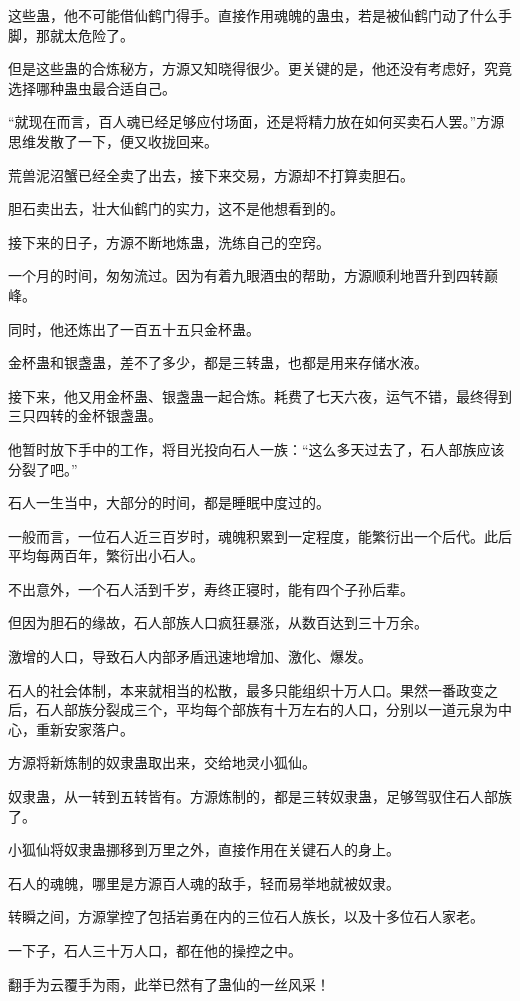 \begin{this_body}
这些蛊，他不可能借仙鹤门得手。直接作用魂魄的蛊虫，若是被仙鹤门动了什么手脚，那就太危险了。

但是这些蛊的合炼秘方，方源又知晓得很少。更关键的是，他还没有考虑好，究竟选择哪种蛊虫最合适自己。

“就现在而言，百人魂已经足够应付场面，还是将精力放在如何买卖石人罢。”方源思维发散了一下，便又收拢回来。

荒兽泥沼蟹已经全卖了出去，接下来交易，方源却不打算卖胆石。

胆石卖出去，壮大仙鹤门的实力，这不是他想看到的。

接下来的日子，方源不断地炼蛊，洗练自己的空窍。

一个月的时间，匆匆流过。因为有着九眼酒虫的帮助，方源顺利地晋升到四转巅峰。

同时，他还炼出了一百五十五只金杯蛊。

金杯蛊和银盏蛊，差不了多少，都是三转蛊，也都是用来存储水液。

接下来，他又用金杯蛊、银盏蛊一起合炼。耗费了七天六夜，运气不错，最终得到三只四转的金杯银盏蛊。

他暂时放下手中的工作，将目光投向石人一族：“这么多天过去了，石人部族应该分裂了吧。”

石人一生当中，大部分的时间，都是睡眠中度过的。

一般而言，一位石人近三百岁时，魂魄积累到一定程度，能繁衍出一个后代。此后平均每两百年，繁衍出小石人。

不出意外，一个石人活到千岁，寿终正寝时，能有四个子孙后辈。

但因为胆石的缘故，石人部族人口疯狂暴涨，从数百达到三十万余。

激增的人口，导致石人内部矛盾迅速地增加、激化、爆发。

石人的社会体制，本来就相当的松散，最多只能组织十万人口。果然一番政变之后，石人部族分裂成三个，平均每个部族有十万左右的人口，分别以一道元泉为中心，重新安家落户。

方源将新炼制的奴隶蛊取出来，交给地灵小狐仙。

奴隶蛊，从一转到五转皆有。方源炼制的，都是三转奴隶蛊，足够驾驭住石人部族了。

小狐仙将奴隶蛊挪移到万里之外，直接作用在关键石人的身上。

石人的魂魄，哪里是方源百人魂的敌手，轻而易举地就被奴隶。

转瞬之间，方源掌控了包括岩勇在内的三位石人族长，以及十多位石人家老。

一下子，石人三十万人口，都在他的操控之中。

翻手为云覆手为雨，此举已然有了蛊仙的一丝风采！

\end{this_body}


